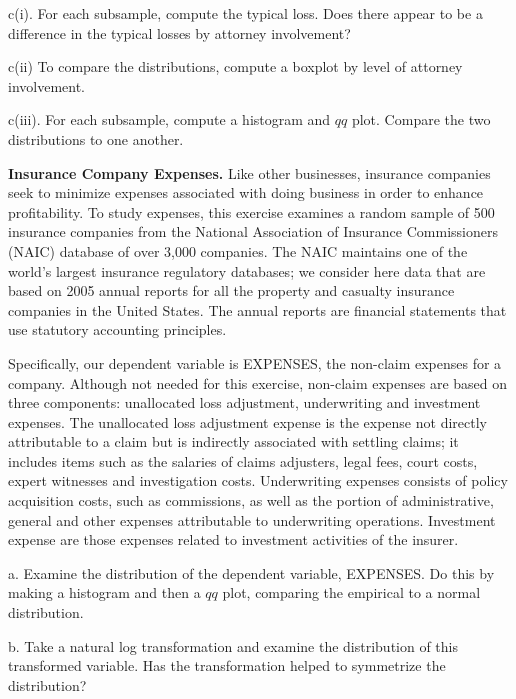 \begin{exercises}
c(i). For each subsample, compute the typical loss. Does there
appear to be a difference in the typical losses by attorney
involvement?

c(ii) To compare the distributions, compute a boxplot by level of
attorney involvement.

c(iii). For each subsample, compute a histogram and $qq$ plot.
Compare the two distributions to one another.



\item  \textbf{Insurance Company Expenses.}\label{Ex:NAICExpense}
Like other businesses, insurance companies seek to minimize expenses
associated with doing business in order to enhance profitability. To
study expenses, this exercise examines a random sample of 500
insurance companies from the National Association of Insurance
Commissioners (NAIC) database of over 3,000 companies. The NAIC
maintains one of the world's largest insurance regulatory databases;
we consider here data that are based on 2005 annual reports for all
the property and casualty insurance companies in the United States.
The annual reports are financial statements that use statutory
accounting principles.

Specifically, our dependent variable is EXPENSES, the non-claim
expenses for a company. Although not needed for this exercise,
non-claim expenses are based on three components: unallocated loss
adjustment, underwriting and investment expenses. The unallocated
loss adjustment expense is the expense not directly attributable to
a claim but is indirectly associated with settling claims; it
includes items such as the salaries of claims adjusters, legal fees,
court costs, expert witnesses and investigation costs. Underwriting
expenses consists of policy acquisition costs, such as commissions,
as well as the portion of administrative, general and other expenses
attributable to underwriting operations. Investment expense are
those expenses related to investment activities of the insurer.

a. Examine the distribution of the dependent variable, EXPENSES. Do
this by making a histogram and then a $qq$ plot, comparing the
empirical to a normal distribution.

b. Take a natural log transformation and examine the distribution of
this transformed variable. Has the transformation helped to
symmetrize the distribution?




\end{exercises}
